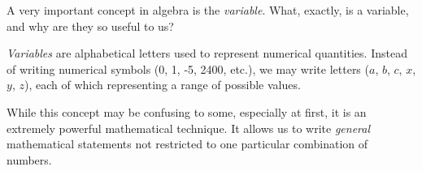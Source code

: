 

A very important concept in algebra is the {\it variable}.  What, exactly, is a variable, and why are they so useful to us?







{\it Variables} are alphabetical letters used to represent numerical quantities.  Instead of writing numerical symbols (0, 1, -5, 2400, etc.), we may write letters ($a$, $b$, $c$, $x$, $y$, $z$), each of which representing a range of possible values.







While this concept may be confusing to some, especially at first, it is an extremely powerful mathematical technique.  It allows us to write {\it general} mathematical statements not restricted to one particular combination of numbers.




